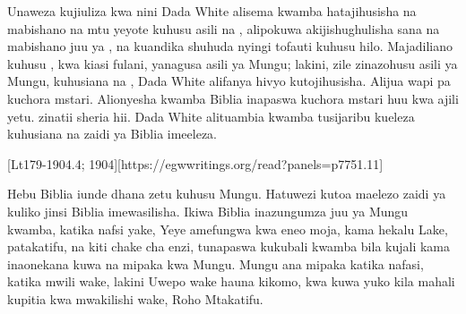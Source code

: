 Unaweza kujiuliza kwa nini Dada White alisema kwamba hatajihusisha na mabishano na mtu yeyote kuhusu asili na , alipokuwa akijishughulisha sana na mabishano juu ya , na kuandika shuhuda nyingi tofauti kuhusu hilo. Majadiliano kuhusu , kwa kiasi fulani, yanagusa asili ya Mungu; lakini, zile zinazohusu asili ya Mungu, kuhusiana na , Dada White alifanya hivyo kutojihusisha. Alijua wapi pa kuchora mstari. Alionyesha kwamba Biblia inapaswa kuchora mstari huu kwa ajili yetu.   zinatii sheria hii. Dada White alituambia kwamba tusijaribu kueleza kuhusiana na  zaidi ya Biblia imeeleza.

[Lt179-1904.4; 1904][https://egwwritings.org/read?panels=p7751.11]

Hebu Biblia iunde dhana zetu kuhusu Mungu. Hatuwezi kutoa maelezo zaidi ya  kuliko jinsi Biblia imewasilisha. Ikiwa Biblia inazungumza juu ya Mungu kwamba, katika nafsi yake, Yeye amefungwa kwa eneo moja, kama hekalu Lake, patakatifu, na kiti chake cha enzi, tunapaswa kukubali kwamba bila kujali kama inaonekana kuwa na mipaka kwa Mungu. Mungu ana mipaka katika nafasi, katika mwili wake, lakini Uwepo wake hauna kikomo, kwa kuwa yuko kila mahali kupitia kwa mwakilishi wake, Roho Mtakatifu.

